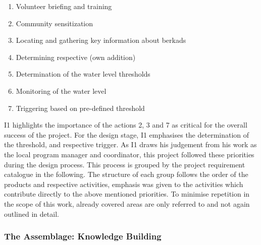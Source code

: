 \begin{enumerate}
    \item Volunteer briefing and training
    \item Community sensitization
    \item Locating and gathering key information about berkads
    \item Determining respective  (own addition)
    \item Determination of the water level thresholds 
    \item Monitoring of the water level
    \item Triggering  based on pre-defined threshold    
\end{enumerate}

I1 highlights the importance of the actions 2, 3 and 7 as critical for the overall success of the project. For the design stage, I1 emphasises the determination of the threshold,  and respective trigger. As I1 draws his judgement from his work as the local program manager and coordinator, this project followed these priorities during the design process. This process is grouped by the project requirement catalogue in the following. The structure of each group follows the order of the products and respective activities, emphasis was given to the activities which contribute directly to the above mentioned priorities. To minimise repetition in the scope of this work, already covered areas are only referred to and not again outlined in detail. 

\subsubsection*{The Assemblage: Knowledge Building}\label{subsubsec:assemblage}

